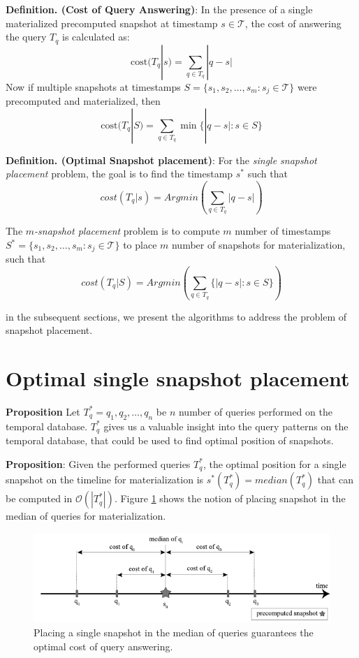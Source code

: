\textbf{Definition. (Cost of Query Answering)}: In the presence of a single materialized precomputed snapshot at timestamp $s \in \mathcal{T}$, the cost of answering the query $T_q$ is calculated as:
$$\mathrm{cost}(T_q | s) = \sum_{q\in T_q} |q - s|$$
Now if multiple snapshots at timestamps $S=\{s_1, s_2, \dots, s_m : s_j \in \mathcal{T}\}$ were precomputed and materialized, then 
$$\mathrm{cost}(T_q|S) = \sum_{q\in T_q} \min\{|q-s| : s\in S\}$$

\textbf{Definition. (Optimal Snapshot placement)}: For the \emph{single snapshot placement} problem, the goal is to find the timestamp $s^*$ such that 
$$cost(T_q|s)= Arg min(\sum_{q\in T_q}|q - s|)$$

The \emph{$m$-snapshot placement} problem is to compute $m$ number of timestamps $S^*=\{s_1, s_2, \dots, s_m: s_j \in \mathcal{T}\}$ to place $m$ number of snapshots for materialization, such that 
$$cost(T_q|S)= Arg min(\sum_{q\in T_q}\{|q - s|:s \in S\})$$

in the subsequent sections, we present the algorithms to address the problem of snapshot placement.

\section{Optimal single snapshot placement}
\textbf{Proposition} Let $T_q^* = {q_1,q_2, \dots , q_n}$ be $n$ number of queries performed on the temporal database. $T_q^*$ gives us a valuable insight into the query patterns on the temporal database, that could be used to find optimal position of snapshots.

\textbf{Proposition}: Given the performed queries $T_q^*$, the optimal position for a single snapshot on the timeline for materialization is $s^*(T_q^*)=median(T_q^*)$ that can be computed in $\mathcal{O}(|T_q^*|)$. Figure \ref{fig:optimal_materialization} shows the notion of placing snapshot in the median of queries for materialization.

\begin{figure}
	\centering
	\includegraphics[width=\textwidth]{figs/optimal_materialization.pdf}
	\caption{Placing a single snapshot in the median of queries guarantees the optimal cost of query answering.}
	\label{fig:optimal_materialization}
\end{figure}

